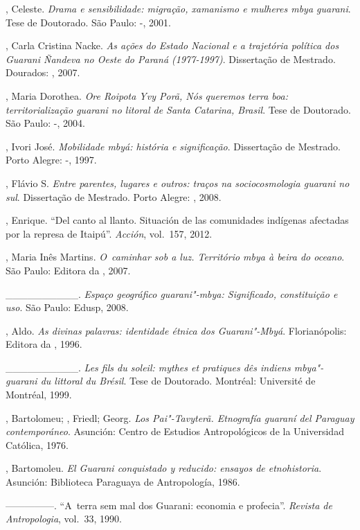 \begin{Parskip}
, Celeste. \emph{Drama e sensibilidade: migração, xamanismo e
mulheres mbya guarani}. Tese de Doutorado. São Paulo: -, 2001.

, Carla Cristina Nacke. \emph{As ações do Estado Nacional e a
trajetória política dos Guarani Ñandeva no Oeste do Paraná (1977-1997)}.
Dissertação de Mestrado. Dourados: , 2007.

, Maria Dorothea. \emph{Ore Roipota Yvy Porã, Nós queremos terra boa:
territorialização guarani no litoral de Santa Catarina, Brasil}. Tese de
Doutorado. São Paulo: -, 2004.

, Ivori José. \emph{Mobilidade mbyá: história e significação}.
Dissertação de Mestrado. Porto Alegre: -, 1997.

, Flávio S. \emph{Entre parentes, lugares e outros: traços na
sociocosmologia guarani no sul}. Dissertação de Mestrado. Porto Alegre:
, 2008.

, Enrique. ``Del canto al llanto. Situación de las comunidades
indígenas afectadas por la represa de Itaipú''. \emph{Acción}, vol.~157, 2012.

, Maria Inês Martins. \emph{O~caminhar sob a luz. Território mbya à
beira do oceano}. São Paulo: Editora da , 2007.

\_\_\_\_\_\_\_\_\_\_. \emph{Espaço geográfico guarani"-mbya: Significado,
constituição e uso}. São Paulo: Edusp, 2008.

, Aldo. \emph{As divinas palavras: identidade étnica dos Guarani"-Mbyá}.
Florianópolis: Editora da , 1996.

\_\_\_\_\_\_\_\_\_\_. \emph{Les fils du soleil: mythes et pratiques dês
indiens mbya"-guarani du littoral du Brésil}. Tese de Doutorado.
Montréal: Université de Montréal, 1999.

, Bartolomeu; , Friedl;  Georg. \emph{Los Pai"-Tavyterã.
Etnografía guaraní del Paraguay contemporáneo}. Asunción: Centro de
Estudios Antropológicos de la Universidad Católica, 1976.

, Bartomoleu. \emph{El Guarani conquistado y reducido: ensayos de
etnohistoria}. Asunción: Biblioteca Paraguaya de Antropología, 1986.

—————. ``A~terra sem mal dos Guarani: economia e profecia''. \emph{Revista de
Antropologia}, vol.~33, 1990. 


\end{Parskip}
